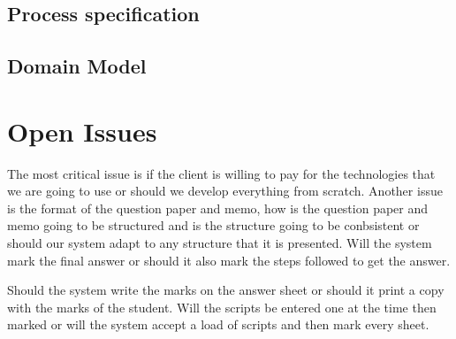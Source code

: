 \documentclass{article}
\begin{document}
	\subsection{Process specification}
	\subsection{Domain Model}
	
\section{Open Issues}
	 The most critical issue is if the client is willing to pay for the technologies that we are going to use or should we develop everything from scratch. Another issue is the format of the question paper and memo, how is the question paper and memo going to be structured and is the structure going to be conbsistent or should our system adapt to any structure that it is presented. Will the system mark the final answer or should it also mark the steps followed to get the answer. \par
	 Should the system write the marks on the answer sheet or should it print a copy with the marks of the student. Will the scripts be entered one at the time then marked or will the system accept a load of scripts and then mark every sheet. 
\end{document}
